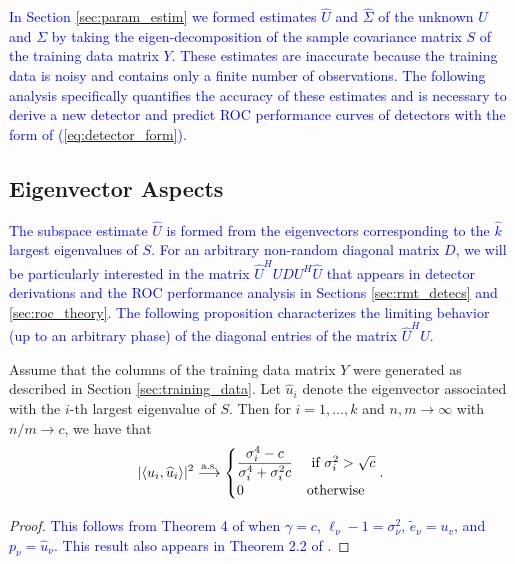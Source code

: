 \textcolor{blue}{In Section \ref{sec:param_estim} we formed estimates $\widehat{U}$ and $\widehat{\Sigma}$ of the unknown $U$ and $\Sigma$ by taking the eigen-decomposition of the sample covariance matrix $S$ of the training data matrix $Y$. These estimates are inaccurate because the training data is noisy and contains only a finite number of observations. The following analysis specifically quantifies the accuracy of these estimates and is necessary to derive a new detector and predict ROC performance curves of detectors with the form of (\ref{eq:detector_form}).}

\subsection{Eigenvector Aspects}\label{sec:eigvect_aspects}

\textcolor{blue}{The subspace estimate $\widehat{U}$ is formed from the eigenvectors corresponding to the $\widehat{k}$ largest eigenvalues of $S$. For an arbitrary non-random diagonal matrix $D$, we will be particularly interested in the matrix $\widehat{U}^HUDU^H\widehat{U}$ that appears in detector derivations and the ROC performance analysis in Sections \ref{sec:rmt_detecs} and \ref{sec:roc_theory}. The following proposition characterizes the limiting behavior (up to an arbitrary phase) of the diagonal entries of the matrix $\widehat{U}^HU$.}

\begin{prop}\label{th:angles}
Assume that the columns of the training data matrix $Y$ were generated as described in Section \ref{sec:training_data}. Let $\widehat{u}_{i}$ denote the eigenvector associated with the $i$-th largest eigenvalue of $S$. Then for $i = 1, \ldots, k$ and $n, m \longrightarrow \infty$ with $n/m \to c$, we have that
\begin{equation}\label{eq:angles}
|\langle u_i,\widehat{u}_i\rangle|^2 \convas
\begin{cases}
\dfrac{\sigma_i^4-c}{\sigma_{i}^4+\sigma_{i}^2c} & \text{ if } \sigma_{i}^2>\sqrt{c}\\
0 & \textrm{otherwise}\\
\end{cases}.
\end{equation}
\end{prop}
\begin{proof}
\textcolor{blue}{This follows from Theorem 4 of \cite{paul2007asymptotics} when $\gamma=c$, $\ell_\nu-1=\sigma_\nu^2$, $\widetilde{e}_\nu=u_v$, and $p_\nu=\widehat{u}_\nu$. This result also appears in Theorem 2.2 of \cite{benaych2011eigenvalues}.}
\end{proof}

